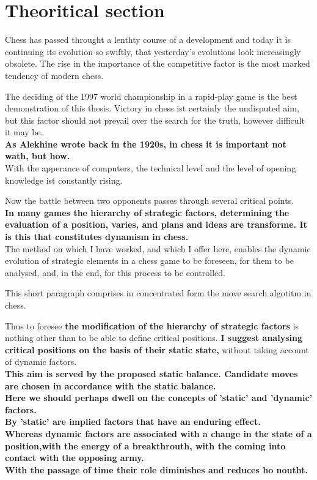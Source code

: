 \documentclass[10pt]{article}
\begin{document}

\section{Theoritical section}
Chess has passed throught a lenthty course of a development and today it is
continuing its evolution so swiftly, that yesterday's evolutions look
increasingly obsolete. The rise in the importance of the competitive factor
is the most marked tendency of modern chess.

The deciding of the 1997 world championship in a rapid-play game is the best
demonstration of this thesis. Victory in chess ist certainly the undisputed
aim, but this factor should not prevail over the search for the truth,
however difficult it may be.\\

\textbf{As Alekhine wrote back in the 1920s, in chess it is important not 
wath, but how.}\\

With the apperance of computers, the technical level and the level of 
opening knowledge ist constantly rising.

Now the battle between two opponents passes through several critical points.\\

\textbf{In many games the hierarchy of strategic factors, determining the evaluation
of a position, varies, and plans and ideas are transforme.
It is this that constitutes dynamism in chess.}\\

The method on which I have worked, and which I offer here, enables the
dynamic evolution of strategic elements in a chess game to be foreseen, for
them to be analysed, and, in the end, for this process to be controlled.

This short paragraph comprises in concentrated form the move search algotitm
in chess.

Thus to foresee \textbf{the modification of the hierarchy of strategic
factors} is nothing other than to be able to define critical positions.
\textbf{I suggest analysing critical positions on the basis of their
static state,} without taking account of dynamic factors.\\

\textbf{This aim is served by the proposed static balance.
Candidate moves are chosen in accordance with the static balance.\\
Here we should perhaps dwell on the concepts of 'static' and 'dynamic'
factors.\\
By 'static' are implied factors that have an enduring effect.\\
Whereas dynamic factors are associated with a change in the state of a
position,with the energy of a breakthrouth, with the coming into contact
with the opposing army.\\
With the passage of time their role diminishes and reduces ho noutht.}\\
\end{document}

